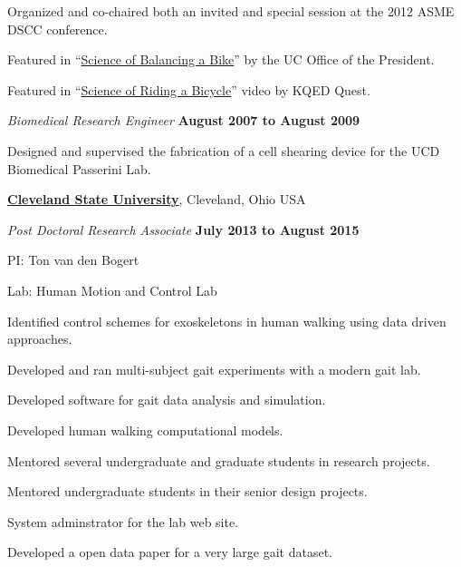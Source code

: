 \documentclass[10pt]{article}
\newenvironment{outerlist}[1][\enskip\textbullet]%
        {\begin{itemize}[#1]}{\end{itemize}%
         \vspace{-.6\baselineskip}}
\newenvironment{innerlist}[1][\enskip\textbullet]%
        {\begin{compactitem}[#1]}{\end{compactitem}}
\newcommand{\blankline}{\quad\pagebreak[2]}
\begin{document}
\begin{outerlist}
\begin{innerlist}
    \item Organized and co-chaired both an invited and special session at the
      2012 ASME DSCC conference.
    \item Featured in ``\href{http://youtu.be/HcYbn_RCLiw}{Science of
      Balancing a Bike}'' by the UC Office of the President.
    \item Featured in ``\href{http://youtu.be/zShn5xMueso}{Science of Riding a
      Bicycle}'' video by KQED Quest.
  \end{innerlist}
  \item[] \textit{Biomedical Research Engineer}%
        \hfill \textbf{August 2007 to August 2009}
  \begin{innerlist}
    \item Designed and supervised the fabrication of a cell shearing device for
      the UCD Biomedical Passerini Lab.
  \end{innerlist}
\end{outerlist}

\blankline

\href{http://csuohio.edu}{\textbf{Cleveland State University}}, Cleveland, Ohio USA
\begin{outerlist}
  \item[] \textit{Post Doctoral Research Associate}
    \hfill \textbf{July 2013 to August 2015}
  \begin{innerlist}
    \item PI: Ton van den Bogert
    \item Lab: Human Motion and Control Lab
    \item Identified control schemes for exoskeletons in human walking using
      data driven approaches.
    \item Developed and ran multi-subject gait experiments with a modern gait
      lab.
    \item Developed software for gait data analysis and simulation.
    \item Developed human walking computational models.
    \item Mentored several undergraduate and graduate students in research
      projects.
    \item Mentored undergraduate students in their senior design projects.
    \item System adminstrator for the lab web site.
    \item Developed a open data paper for a very large gait dataset.
  \end{innerlist}
\end{outerlist}
\end{document}
